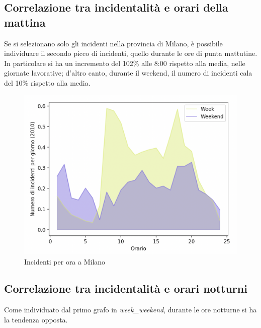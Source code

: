 \documentclass[a4paper]{report}
\begin{document}
\subsection{Correlazione tra incidentalità e orari della mattina}

Se si selezionano solo gli incidenti nella provincia di Milano, è possibile individuare 
il secondo picco di incidenti, quello durante le ore di punta mattutine.
In particolare si ha un incremento del 102\% alle 8:00 rispetto alla media, nelle 
giornate lavorative;
d'altro canto, durante il weekend, il numero di incidenti cala del 10\% rispetto alla media.


\begin{figure}
    \includegraphics[width=\linewidth]{../src/incidenti/incidenti_senza_coords/ore_punta/week_weekend_milano.png}
    \caption{Incidenti per ora a Milano}
    \label{fig:week_weekend_milano}
\end{figure}


\subsection{Correlazione tra incidentalità e orari notturni}

Come individuato dal primo grafo in \textit{week\_weekend}, durante le 
ore notturne si ha la tendenza opposta.
\end{document}
